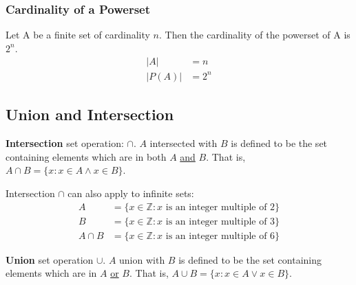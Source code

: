 \subsubsection{Cardinality of a Powerset}

Let A be a finite set of cardinality $n$. Then the cardinality of the powerset of A is $2^n$.
\begin{align*}
  \left\lvert A\right\rvert    & = n   \\
  \left\lvert P(A)\right\rvert & = 2^n
\end{align*}

\subsection{Union and Intersection}

\textbf{Intersection} set operation: $\cap$.
$A$ intersected with $B$ is defined to be the set containing elements which are in both $A$ \underline{and} $B$.
That is, $A \cap B = \{x: x \in A \land x \in B\}$.
\begin{center}
\end{center}

Intersection $\cap$ can also apply to infinite sets:
\begin{align*}
  A        & =\{x \in \mathbb{Z}: x \text{ is an integer multiple of 2}\}  \\
  B        & =\{x \in \mathbb{Z}: x \text{ is an integer multiple of 3}\}  \\
  A \cap B & = \{x \in \mathbb{Z}: x \text{ is an integer multiple of 6}\}
\end{align*}

\noindent \textbf{Union} set operation $\cup$.
$A$ union with $B$ is defined to be the set containing elements which are in $A$ \underline{or} $B$.
That is, $A \cup B = \{x: x \in A \lor x \in B\}$.
\begin{center}
\end{center}

